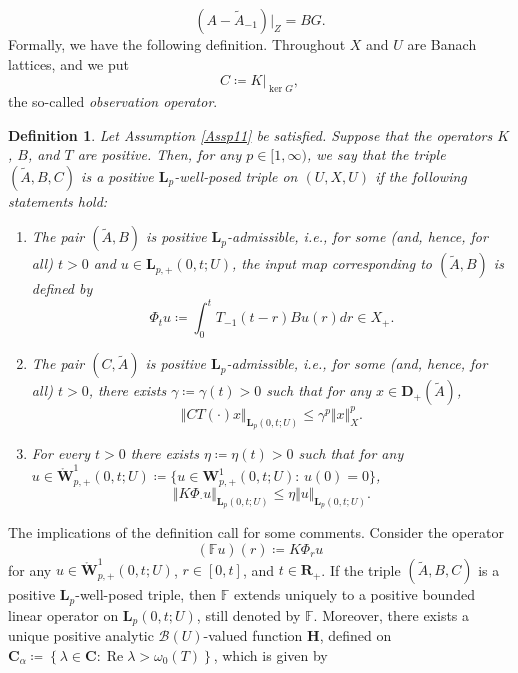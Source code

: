 \documentclass[a4paper,11pt,reqno]{amsart}
\def\calB{{\calB}}
\def\calB{{\mathcal{B}}}
\def\R{\mathbf{R}}
\def\C{\mathbf{C}}
\def\F{\mathbb F}
\theoremstyle{plain}
\newtheorem{definition}{Definition}[section]
\numberwithin{equation}{section}
\begin{document}
\begin{equation}\label{representation}
({A}-\tilde{{A}}_{-1})|_{Z}={B} {G}.
\end{equation}
Formally, we have the following definition. Throughout $X$ and $U$ are Banach lattices, and we put
\begin{equation*}
{C}\coloneqq {K}\vert_{\ker{G}},
\end{equation*}
the so-called \textit{observation operator}.
\begin{definition}\label{Well-posed-triple}
Let Assumption \ref{Assp11} be satisfied. Suppose that the operators $K$, $B$, and $T$ are positive. Then, for any $p\in [1,\infty)$, we say that the triple $(\tilde{{A}},{B},{C})$ is a positive $\bm{L}_p$-well-posed triple on $({U},{X},{U})$ if the following statements hold:
\begin{enumerate}[\normalfont(1)]
\item The pair $(\tilde{{A}}, {B})$ is positive $\bm{L}_p$-admissible, i.e., for some (and, hence, for all) $t>0$ and $u\in \bm{L}_{p,+}(0,t;{U})$, the input map corresponding to $(\tilde{{A}}, {B})$ is defined by
\begin{equation*}
\Phi_{t}u\coloneqq \int_{0}^{t} T_{-1}(t-r){B}u(r)dr\in {X}_+.
\end{equation*}
\item The pair $(C,\tilde{A})$ is positive $\bm{L}_p$-admissible, i.e., for some (and, hence, for all) $t >0$, there exists $\gamma\coloneqq \gamma(t)>0$ such that for any $x\in \bm{D}_+(\tilde{{A}})$,
\begin{equation*}
\Vert {C} T(\cdot)x\Vert_{\bm{L}_{p}(0,t;{U})}\leq \gamma^p\Vert x\Vert_X^p. 
\end{equation*}
\item For every $t>0$ there exists $\eta\coloneqq \eta(t)>0 $ such that for any $ u\in \mathring{\bm{W}}^{1}_{p,+}(0,t;{U})\coloneqq \{ u\in \bm{W}^{1}_{p,+}(0,t;{U}):\, u(0)=0\}$,
\begin{equation*}
\Vert{K} \Phi_\cdot u\Vert_{\bm{L}_{p}(0,t;{U})}\leq \eta \Vert u\Vert_{\bm{L}_{p}(0,t;{U})}.
\end{equation*}
\end{enumerate}
\end{definition}
The implications of the definition call for some comments. Consider the operator
\begin{equation*}\label{input.output.operator}
(\F u)(r)\coloneqq {K}\Phi_r u
\end{equation*}
for any $u\in \mathring{\bm{W}}^{1}_{p,+}(0,t;{U})$, $r\in [0,t]$, and $t\in\R_+$. If the triple $(\tilde{{A}},{B},{C})$ is a positive $\bm{L}_p$-well-posed triple, then $\F$ extends uniquely to a positive bounded linear operator on $\bm{L}_{p}(0,t;{U})$, still denoted by $\F$. Moreover, there exists a unique positive analytic $\calB({U})$-valued function $\mathbf{H}$, defined on $\C_\alpha\coloneqq\left\{\lambda\in \C: \operatorname{Re}\lambda > \omega_0(T)\right\}$, which is given by
\end{document}
